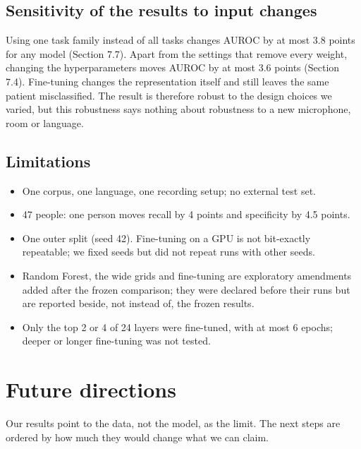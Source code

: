 \documentclass[11pt,a4paper]{article}
\begin{document}
\subsection{Sensitivity of the results to input changes}\label{sec:inputsens}
Using one task family instead of all tasks changes AUROC by at most 3.8 points for any model (Section 7.7). Apart from the settings that remove every weight, changing the hyperparameters moves AUROC by at most 3.6 points (Section 7.4). Fine-tuning changes the representation itself and still leaves the same patient misclassified. The result is therefore robust to the design choices we varied, but this robustness says nothing about robustness to a new microphone, room or language.

\subsection{Limitations}\label{sec:limitations}
\begin{itemize}\item One corpus, one language, one recording setup; no external test set.
\item 47 people: one person moves recall by 4 points and specificity by 4.5 points.
\item One outer split (seed 42). Fine-tuning on a GPU is not bit-exactly repeatable; we fixed seeds but did not repeat runs with other seeds.
\item Random Forest, the wide grids and fine-tuning are exploratory amendments added after the frozen comparison; they were declared before their runs but are reported beside, not instead of, the frozen results.
\item Only the top 2 or 4 of 24 layers were fine-tuned, with at most 6 epochs; deeper or longer fine-tuning was not tested.
\end{itemize}
\section{Future directions}\label{sec:future}
Our results point to the data, not the model, as the limit. The next steps are ordered by how much they would change what we can claim.
\end{document}
